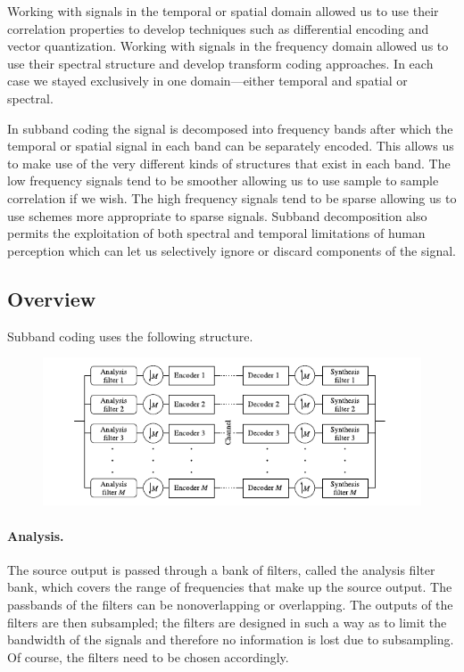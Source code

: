 
Working with signals in the temporal or spatial domain allowed us to use their correlation properties to develop techniques such as differential encoding and vector quantization. Working with signals in the frequency domain allowed us to use their spectral structure and develop transform coding approaches. In each case we stayed exclusively in one domain—either temporal and spatial or spectral.


In subband coding the signal is decomposed into frequency bands after which the temporal or spatial signal in each band can be separately encoded. This allows us to make use of the very different kinds of structures that exist in each band. The low frequency signals tend to be smoother allowing us to use sample to sample correlation if we wish. The high frequency signals tend to be sparse allowing us to use schemes more appropriate to sparse signals. Subband decomposition also permits the exploitation of both spectral and temporal limitations of human perception which can let us selectively ignore or discard components of the signal.


\subsection{Overview}

Subband coding uses the following structure.


\begin{figure}[H]
    \centering
    \includegraphics[scale=0.7]{images/2021-11-09-subband_01.png}
\end{figure}


\paragraph{Analysis.} The source output is passed through a bank of filters, called the analysis filter bank, which covers the range of frequencies that make up the source output. The passbands of the filters can be nonoverlapping or overlapping. The outputs of the filters are then subsampled; the filters are designed in such a way as to limit the bandwidth of the signals and therefore no information is lost due to subsampling. Of course, the filters need to be chosen accordingly.



